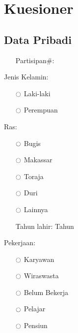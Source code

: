 




\section*{Kuesioner}
\subsection*{Data Pribadi}

\begin{itemize}
\item[Partisipan\#:]\underline{\hspace{2cm}}
\end{itemize}

Jenis Kelamin:
\begin{multicols}{2}
\begin{itemize}
\item[$\ocircle$] Laki-laki \item [$\ocircle$] Perempuan
\end{itemize}
\end{multicols}

Ras:
\begin{multicols}{3}
\begin{itemize}
\item[$\ocircle$] Bugis
\item[$\ocircle$] Makassar
\item[$\ocircle$] Toraja
\item[$\ocircle$] Duri
\item[$\ocircle$] Lainnya \underline{\hspace{2cm}}
\end{itemize}
\end{multicols}

\begin{itemize}
\item[Tahun lahir:] \underline{\hspace{2cm}} Tahun
\end{itemize}

Pekerjaan:
\begin{multicols}{3}
\begin{itemize}
\item[$\ocircle$] Karyawan
\item[$\ocircle$] Wiraswasta
\item[$\ocircle$] Belum Bekerja
\item[$\ocircle$] Pelajar
\item[$\ocircle$] Pensiun
\end{itemize}
\end{multicols}




